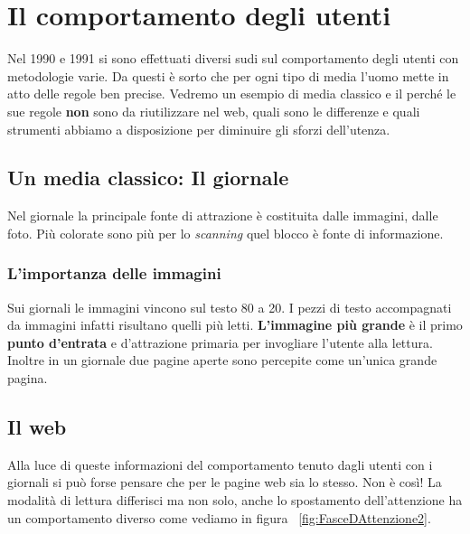 
\section{Il comportamento degli utenti}

	Nel 1990 e 1991 si sono effettuati diversi sudi sul comportamento degli utenti con metodologie varie. Da questi è sorto che per ogni tipo di media l'uomo mette in atto delle regole ben precise. 
	Vedremo un esempio di media classico e il perché le sue regole \textbf{non} sono da riutilizzare nel web, quali sono le differenze e quali strumenti abbiamo a disposizione per diminuire gli sforzi dell'utenza.
	
	\subsection{Un media classico: Il giornale}
	
		Nel giornale la principale fonte di attrazione è costituita dalle immagini, dalle foto. Più colorate sono più per lo \emph{scanning} quel blocco è fonte di informazione.
		
		\subsubsection{L'importanza delle immagini}
		
			Sui giornali le immagini vincono sul testo 80 a 20. I pezzi di testo accompagnati da immagini infatti risultano quelli più letti. \textbf{L'immagine più grande} è il primo \textbf{punto d'entrata} e d'attrazione primaria per invogliare l'utente alla lettura. Inoltre in un giornale due pagine aperte sono percepite come un'unica grande pagina.
		
	\subsection{Il web}
	
		Alla luce di queste informazioni del comportamento tenuto dagli utenti con i giornali si può forse pensare che per le pagine web sia lo stesso. Non è così! La modalità di lettura differisci ma non solo, anche lo spostamento dell'attenzione ha un comportamento diverso come vediamo in figura ~\ref{fig:FasceDAttenzione2}.
		
